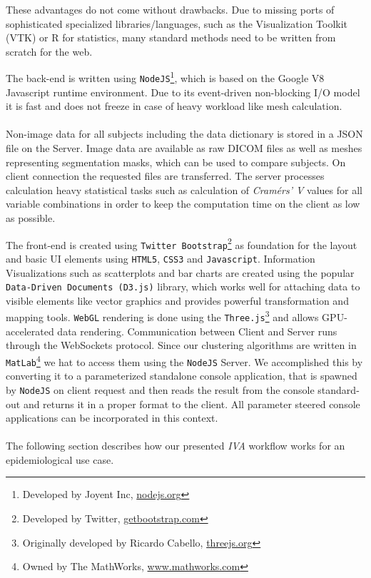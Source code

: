 \documentclass[journal]{style/vgtc} 			          %
\begin{document}
These advantages do not come without drawbacks.
%
Due to missing ports of sophisticated specialized libraries/languages, such as the Visualization Toolkit (VTK) or R for statistics, many standard methods need to be written from scratch for the web.
%

The back-end is written using \texttt{NodeJS}\footnote{Developed by Joyent Inc, \url{nodejs.org}}, which is based on the Google V8 Javascript runtime environment.
%
Due to its event-driven non-blocking I/O model it is fast and does not freeze in case of heavy workload like mesh calculation.
\\\\
Non-image data for all subjects including the data dictionary is stored in a JSON file on the Server.
%
Image data are available as raw DICOM files as well as meshes representing segmentation masks, which can be used to compare subjects.
%
On client connection the requested files are transferred.
%
The server processes calculation heavy statistical tasks such as calculation of \emph{Cram\'{e}rs' V} values for all variable combinations in order to keep the computation time on the client as low as possible.
%

The front-end is created using \texttt{Twitter Bootstrap}\footnote{Developed by Twitter, \url{getbootstrap.com}} as foundation for the layout and basic UI elements using \texttt{HTML5}, \texttt{CSS3} and \texttt{Javascript}.
%
Information Visualizations such as scatterplots and bar charts are created using the popular \texttt{Data-Driven Documents (D3.js)} \cite{D3} library, which works well for attaching data to visible elements like vector graphics and provides powerful transformation and mapping tools.
%
\texttt{WebGL} rendering is done using the \texttt{Three.js}\footnote{Originally developed by Ricardo Cabello, \url{threejs.org}} and allows GPU-accelerated data rendering.
%
Communication between Client and Server runs through the WebSockets protocol.
%
Since our clustering algorithms are written in \texttt{MatLab}\footnote{Owned by The MathWorks, \url{www.mathworks.com}} we hat to access them using the \texttt{NodeJS} Server.
%
We accomplished this by converting it to a parameterized standalone console application, that is spawned by \texttt{NodeJS} on client request and then reads the result from the console standard-out and returns it in a proper format to the client.
%
All parameter steered console applications can be incorporated in this context.
\\\\
The following section describes how our presented \emph{IVA} workflow works for an epidemiological use case.
\end{document}
